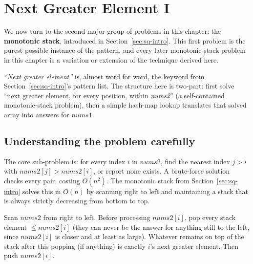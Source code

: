 \section{Next Greater Element I}
\label{sec:sq-next-greater-1}

\noindent We now turn to the second major group of problems in this
chapter: the \textbf{monotonic stack}, introduced in
Section~\ref{sec:sq-intro}. This first problem is the purest possible
instance of the pattern, and every later monotonic-stack problem in this
chapter is a variation or extension of the technique derived here.


\begin{patternbox}
\emph{``Next greater element''} is, almost word for word, the keyword
from Section~\ref{sec:sq-intro}'s pattern list. The structure here is
two-part: first solve ``next greater element, for every position, within
\textit{nums2}'' (a self-contained monotonic-stack problem), then a simple
hash-map lookup translates that solved array into answers for
$\textit{nums1}$.
\end{patternbox}

\subsection*{Understanding the problem carefully}

The core sub-problem is: for every index $i$ in $\textit{nums2}$, find the
nearest index $j>i$ with $\textit{nums2}[j] > \textit{nums2}[i]$, or
report none exists. A brute-force solution checks every pair, costing
$O(n^2)$. The monotonic stack from Section~\ref{sec:sq-intro} solves this
in $O(n)$ by scanning right to left and maintaining a stack that is always
strictly decreasing from bottom to top.

\begin{ideabox}
Scan $\textit{nums2}$ from right to left. Before processing
$\textit{nums2}[i]$, pop every stack element $\le \textit{nums2}[i]$
(they can never be the answer for anything still to the left, since
$\textit{nums2}[i]$ is closer and at least as large). Whatever remains on
top of the stack after this popping (if anything) is exactly
$i$'s next greater element. Then push $\textit{nums2}[i]$.
\end{ideabox}

